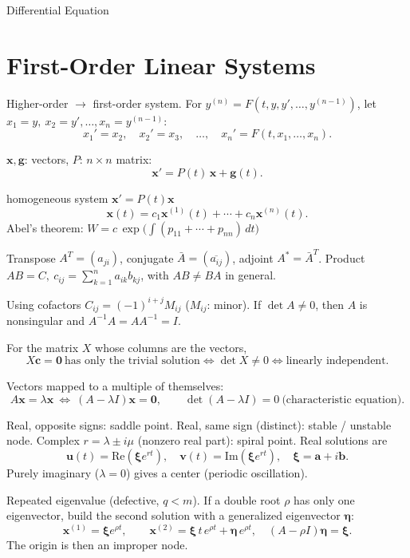 \documentclass[10pt]{article}
\begin{document}
\begin{center}
{Differential Equation}
\end{center}

\section{First-Order Linear Systems}

Higher-order $\to$ first-order system.
For $y^{(n)}=F(t,y,y',\dots,y^{(n-1)})$, let $x_1=y,\ x_2=y',\dots,x_n=y^{(n-1)}$:
\[
x_1'=x_2,\quad x_2'=x_3,\quad\dots,\quad x_n'=F(t,x_1,\dots,x_n).
\]


$\mathbf{x},\mathbf{g}$: vectors, $P$: $n\times n$ matrix:
\[
\mathbf{x}' = P(t)\,\mathbf{x} + \mathbf{g}(t).
\]


homogeneous system $\mathbf{x}'=P(t)\mathbf{x}$
\[
\mathbf{x}(t)=c_1\mathbf{x}^{(1)}(t)+\cdots+c_n\mathbf{x}^{(n)}(t).
\]
Abel's theorem: $W=c\,\exp\!\big(\!\int (p_{11}+\cdots+p_{nn})\,dt\big)$ 


Transpose $A^T=(a_{ji})$, conjugate $\bar A=(\overline{a_{ij}})$, adjoint $A^*=\bar A^{T}$. Product
$AB=C,\ c_{ij}=\sum_{k=1}^{n}a_{ik}b_{kj}$, with $AB\neq BA$ in general.

Using cofactors $C_{ij}=(-1)^{i+j}M_{ij}$ ($M_{ij}$: minor). If $\det A\neq 0$, then $A$ is nonsingular and $A^{-1}A=AA^{-1}=I$.


For the matrix $X$ whose columns are the vectors,
\[
X\mathbf{c}=\mathbf{0}\ \text{has only the trivial solution} \iff \det X\neq 0 \iff \text{linearly independent}.
\]

Vectors mapped to a multiple of themselves:
\[
A\mathbf{x}=\lambda\mathbf{x}\ \Longleftrightarrow\ (A-\lambda I)\mathbf{x}=\mathbf{0},\qquad
\det(A-\lambda I)=0\ \text{(characteristic equation)}.
\]

Real, opposite signs: saddle point.
Real, same sign (distinct): stable / unstable node.
Complex $r=\lambda\pm i\mu$ (nonzero real part): spiral point. Real solutions are
\[
\mathbf{u}(t)=\mathrm{Re}(\boldsymbol{\xi}e^{rt}),\quad \mathbf{v}(t)=\mathrm{Im}(\boldsymbol{\xi}e^{rt}),\quad \boldsymbol{\xi}=\mathbf{a}+i\mathbf{b}.
\]
Purely imaginary ($\lambda=0$) gives a center (periodic oscillation).

Repeated eigenvalue (defective, $q<m$). If a double root $\rho$ has only one eigenvector, build the second solution with a generalized eigenvector $\boldsymbol{\eta}$:
\[
\mathbf{x}^{(1)}=\boldsymbol{\xi}e^{\rho t},\qquad
\mathbf{x}^{(2)}=\boldsymbol{\xi}\,t\,e^{\rho t}+\boldsymbol{\eta}\,e^{\rho t},\quad (A-\rho I)\boldsymbol{\eta}=\boldsymbol{\xi}.
\]
The origin is then an improper node.
\end{document}
